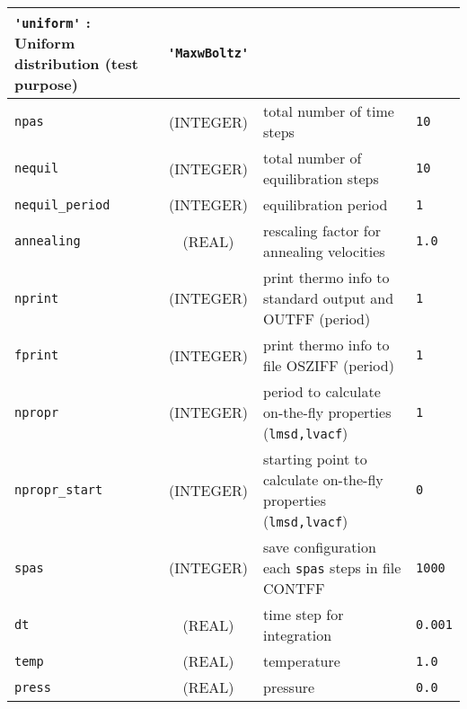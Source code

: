 \documentclass[a4paper]{article}
\begin{document}
\begin{longtable}{l|c|m{8cm}|m{2cm}}
					 \verb?'uniform'?   : Uniform distribution (test purpose) \newline                  & \verb?'MaxwBoltz'? \tabularnewline
\hline
\rule[-0.75cm]{0cm}{1.5cm}
\verb?npas?          & (INTEGER)      &  total number of time steps                                                         & \verb?10?    \\
\hline
\rule[-0.75cm]{0cm}{1.5cm}
\verb?nequil?        & (INTEGER)      &  total number of equilibration steps                                                & \verb?10? \\
\hline
\rule[-0.75cm]{0cm}{1.5cm}
\verb?nequil_period? & (INTEGER)      &  equilibration period                                                               & \verb?1? \\
\hline
\rule[-0.75cm]{0cm}{1.5cm}
\verb?annealing?    & (REAL)          &  rescaling factor for annealing velocities                                          & \verb?1.0? \\
\hline
\rule[-0.75cm]{0cm}{1.5cm}
\verb?nprint?        & (INTEGER)      &  print thermo info to standard output and OUTFF (period)                            & \verb?1? \\
\hline
\rule[-0.75cm]{0cm}{1.5cm}
\verb?fprint?        & (INTEGER)      &  print thermo info to file OSZIFF (period)                                          & \verb?1? \\
\hline
\rule[-0.75cm]{0cm}{1.5cm}
\verb?npropr?        & (INTEGER)      &  period to calculate on-the-fly properties (\verb?lmsd,lvacf?)                      & \verb?1? \\
\hline
\rule[-0.75cm]{0cm}{1.5cm}
\verb?npropr_start?  & (INTEGER)      &  starting point to calculate on-the-fly properties (\verb?lmsd,lvacf?)              & \verb?0? \\
\hline
\rule[-0.75cm]{0cm}{1.5cm}
\verb?spas?          & (INTEGER)      &  save configuration each \verb?spas? steps in file CONTFF                           & \verb?1000? \\
\hline
\rule[-0.75cm]{0cm}{1.5cm}
\verb?dt?            & (REAL)         &  time step for integration                                                          & \verb?0.001? \\
\hline
\rule[-0.75cm]{0cm}{1.5cm}
\verb?temp?          & (REAL)         &  temperature                                                                        & \verb?1.0?\\
\hline
\rule[-0.75cm]{0cm}{1.5cm}
\verb?press?          & (REAL)        &  pressure                                                                           & \verb?0.0?\\

\end{longtable}
\end{document}
